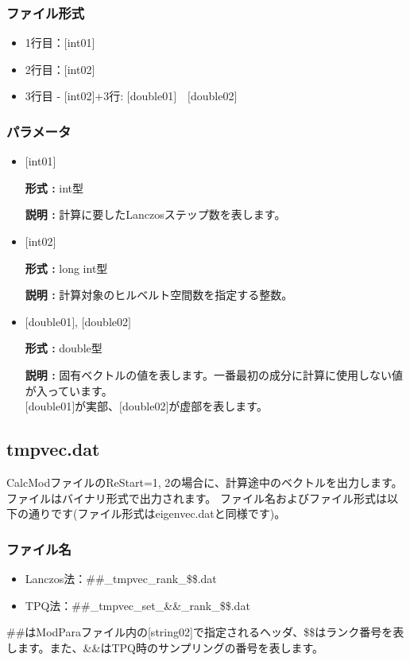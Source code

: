 \subsubsection{ファイル形式}
 \begin{itemize}
   \item  1行目：$[$int01$]$
   \item  2行目：$[$int02$]$
   \item  3行目 - $[$int02$]$+3行: $[$double01$]$~~$[$double02$]$
  \end{itemize}
\subsubsection{パラメータ}
 \begin{itemize}

  \item  $[$int01$]$

 {\bf 形式 :} int型

{\bf 説明 :} { 計算に要したLanczosステップ数を表します。}

  \item  $[$int02$]$

 {\bf 形式 :} long int型

{\bf 説明 :} 計算対象のヒルベルト空間数を指定する整数。

 
 \item  $[$double01$]$, $[$double02$]$

 {\bf 形式 :} double型 

{\bf 説明 :} 固有ベクトルの値を表します。一番最初の成分に計算に使用しない値が入っています。\\
$[$double01$]$が実部、$[$double02$]$が虚部を表します。\\
\end{itemize}

\newpage
\subsection{{tmpvec.dat}}
\label{Subsec:restart}
CalcModファイルのReStart=1, 2の場合に、計算途中のベクトルを出力します。
ファイルはバイナリ形式で出力されます。
ファイル名およびファイル形式は以下の通りです(ファイル形式はeigenvec.datと同様です)。

\subsubsection{ファイル名}
\begin{itemize}
   \item{Lanczos法：\#\#\_tmpvec\_rank\_\$\$.dat}
   \item{TPQ法：\#\#\_tmpvec\_set\_\&\&\_rank\_\$\$.dat}   
\end{itemize}
  \#\#はModParaファイル内の[string02]で指定されるヘッダ、\$\$はランク番号を表します。また、\&\&はTPQ時のサンプリングの番号を表します。

